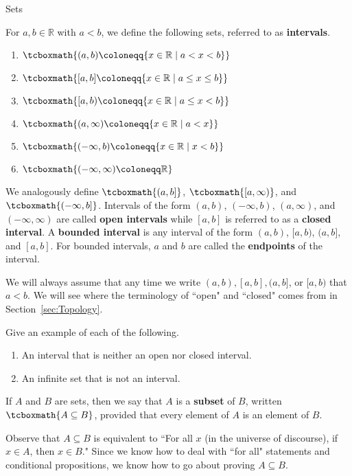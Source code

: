 \begin{section}{Sets}
\begin{definition}\label{def:intervals}
For $a,b\in\mathbb{R}$ with $a<b$, we define the following sets, referred to as \textbf{intervals}.
\begin{enumerate}[label=\textrm{(\alph*)}]
\item $\tcboxmath{(a,b)\coloneqq \{x\in\mathbb{R}\mid a<x<b\}}$
\item $\tcboxmath{[a,b]\coloneqq \{x\in\mathbb{R}\mid a\leq x\leq b\}}$
\item $\tcboxmath{[a,b)\coloneqq \{x\in\mathbb{R}\mid a\leq x< b\}}$
\item $\tcboxmath{(a,\infty)\coloneqq \{x\in\mathbb{R}\mid a<x\}}$
\item $\tcboxmath{(-\infty,b)\coloneqq \{x\in\mathbb{R}\mid x<b\}}$
\item $\tcboxmath{(-\infty,\infty)\coloneqq \mathbb{R}}$
\end{enumerate}
We analogously define $\tcboxmath{(a,b]}$, $\tcboxmath{[a,\infty)}$, and $\tcboxmath{(-\infty,b]}$. Intervals of the form $(a,b)$, $(-\infty,b)$, $(a,\infty)$, and $(-\infty,\infty)$ are called \textbf{open intervals} while $[a,b]$ is referred to as a \textbf{closed interval}. A \textbf{bounded interval} is any interval of the form $(a,b)$, $[a,b)$, $(a,b]$, and $[a,b]$. For bounded intervals, $a$ and $b$ are called the \textbf{endpoints} of the interval.
\end{definition}

We will always assume that any time we write $(a,b), [a,b], (a,b]$, or $[a,b)$ that $a<b$. We will see where the terminology of ``open" and ``closed" comes from in Section~\ref{sec:Topology}. 

\begin{problem}
Give an example of each of the following.
\begin{enumerate}[label=\textrm{(\alph*)}]
\item An interval that is neither an open nor closed interval.
\item An infinite set that is not an interval.
\end{enumerate}
\end{problem}

\begin{definition}
If $A$ and $B$ are sets, then we say that $A$ is a \textbf{subset} of $B$, written $\tcboxmath{A\subseteq B}$, provided that every element of $A$ is an element of $B$.
\end{definition}

Observe that $A\subseteq B$ is equivalent to ``For all $x$ (in the universe of discourse), if $x\in A$, then $x\in B$."  Since we know how to deal with ``for all" statements and conditional propositions, we know how to go about proving $A\subseteq B$.


\end{section}
